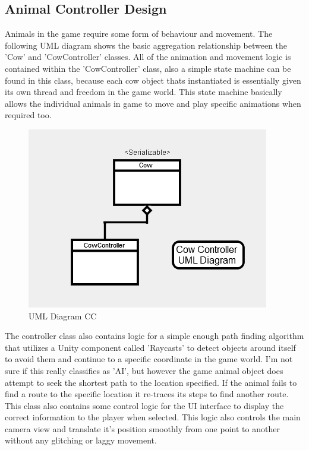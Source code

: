 \subsection{Animal Controller Design}
Animals in the game require some form of behaviour and movement. The following UML diagram shows the basic aggregation relationship between the 'Cow' and 'CowController' classes. All of the animation and movement logic is contained within the 'CowController' class, also a simple state machine can be found in this class, because each cow object thats instantiated is essentially given its own thread and freedom in the game world. This state machine basically allows the individual animals in game to move and play specific animations when required too.

\begin{figure}[!ht]
	\caption{UML Diagram CC}
	\centering
	\includegraphics{img/cow_uml.png}
\end{figure}

The controller class also contains logic for a simple enough path finding algorithm that utilizes a Unity component called 'Raycasts' to detect objects around itself to avoid them and continue to a specific coordinate in the game world. I'm not sure if this really classifies as 'AI', but however the game animal object does attempt to seek the shortest path to the location specified. If the animal fails to find a route to the specific location it re-traces its steps to find another route.
This class also contains some control logic for the UI interface to display the correct information to the player when selected. This logic also controls the main camera view and translate it's position smoothly from one point to another without any glitching or laggy movement.


